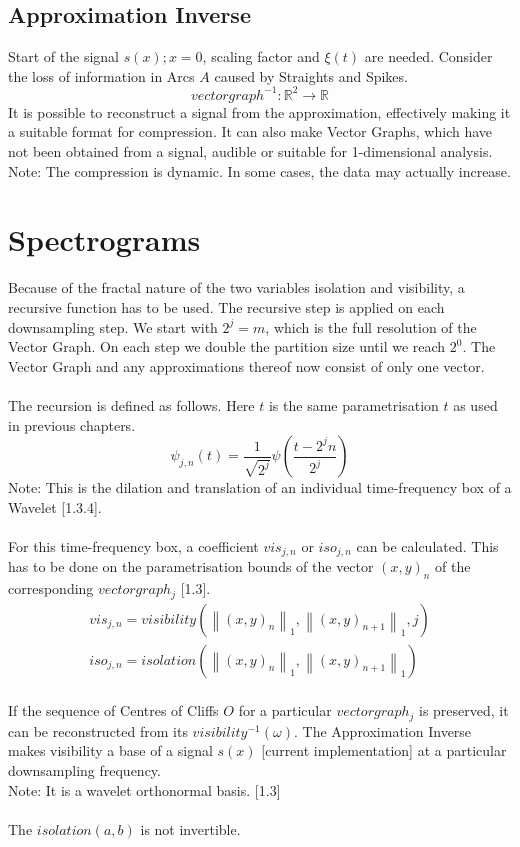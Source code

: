 \documentclass{report}
\newcommand\norm[1]{\left\lVert#1\right\rVert}
\begin{document}
\section{Approximation Inverse}
Start of the signal $s(x);x=0$, scaling factor and $\xi(t)$ are needed. Consider the loss of information in Arcs $A$ caused by Straights and Spikes.
\begin{equation}
vectorgraph^{-1}: \mathbb{R}^2 \rightarrow \mathbb{R}
\end{equation}
It is possible to reconstruct a signal from the approximation, effectively making it a suitable format for compression. It can also make Vector Graphs, which have not been obtained from a signal, audible or suitable for 1-dimensional analysis.\\
Note: The compression is dynamic. In some cases, the data may actually increase.

\chapter{Spectrograms}
Because of the fractal nature of the two variables isolation and visibility, a recursive function has to be used. The recursive step is applied on each downsampling step. We start with $2^j=m$, which is the full resolution of the Vector Graph. On each step we double the partition size until we reach $2^0$. The Vector Graph and any approximations thereof now consist of only one vector.\\\\
The recursion is defined as follows. Here $t$ is the same parametrisation $t$ as used in previous chapters.
\begin{equation}
\psi_{j,n}(t)=\frac{1}{\sqrt{2^j}}\psi(\frac{t-2^j n}{2^j})
\end{equation}
Note: This is the dilation and translation of an individual time-frequency box of a Wavelet \cite{Mallat}[1.3.4].\\\\
For this time-frequency box, a coefficient $vis_{j,n}$ or $iso_{j,n}$ can be calculated. This has to be done on the parametrisation bounds of the vector $(x,y)_n$ of the corresponding $vectorgraph_{j}$ \cite{Grapher}[1.3].
\begin{align}
vis_{j,n}=visibility(\norm{(x,y)_{n}}_{1},\norm{(x,y)_{n+1}}_{1},j)\\
iso_{j,n}=isolation(\norm{(x,y)_{n}}_{1},\norm{(x,y)_{n+1}}_{1})
\end{align}\\
If the sequence of Centres of Cliffs $O$ for a particular $vectorgraph_{j}$ is preserved, it can be reconstructed from its $visibility^{-1}(\omega)$. The Approximation Inverse makes visibility a base of a signal $s(x)$ \cite{Grapher}[current implementation] at a particular downsampling frequency.\\ Note: It is a wavelet orthonormal basis. \cite{Mallat}[1.3]\\\\
The $isolation(a,b)$ is not invertible.\\\\
\end{document}

